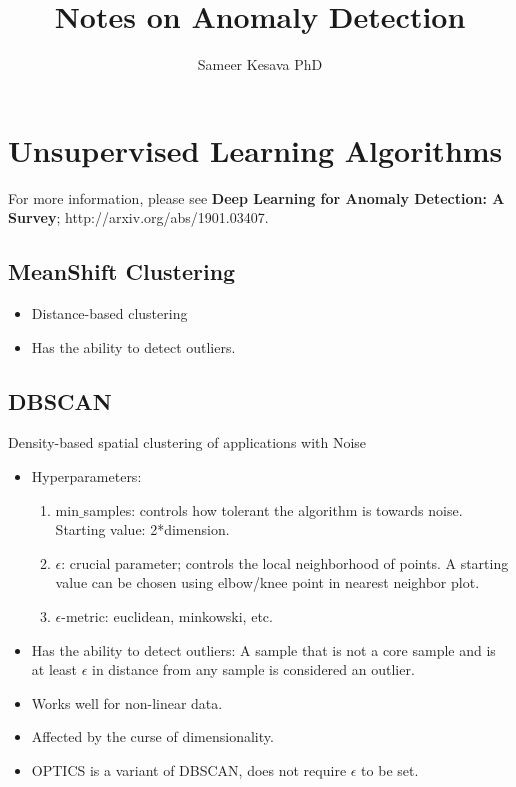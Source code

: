 \documentclass[a4paper, 12pt]{report}
\begin{document}
\title{Notes on Anomaly Detection}
\author{Sameer Kesava PhD}
\date{} %
\maketitle

\tableofcontents
\newpage





\chapter{Unsupervised Learning Algorithms}
For more information, please see \textbf{Deep Learning for Anomaly Detection: A Survey}; http://arxiv.org/abs/1901.03407. 
\section{MeanShift Clustering}
\begin{itemize}
\item Distance-based clustering
\item Has the ability to detect outliers.
\end{itemize}

\section{DBSCAN}
Density-based spatial clustering of applications with Noise
\begin{itemize}
\item Hyperparameters: 
\begin{enumerate}
\item min$\_$samples: controls how tolerant the algorithm is towards noise. Starting value: 2*dimension.
\item$\epsilon$: crucial parameter; controls the local neighborhood of points. A starting value can be chosen using elbow/knee point in nearest neighbor plot.
\item $\epsilon$-metric: euclidean, minkowski, etc.
\end{enumerate}
\item Has the ability to detect outliers: A sample that is not a core sample and is at least $\epsilon$ in distance from any sample is considered an outlier.
\item Works well for non-linear data.
\item Affected by the curse of dimensionality.
\item OPTICS is a variant of DBSCAN, does not require $\epsilon$ to be set.
\end{itemize}
\end{document}
